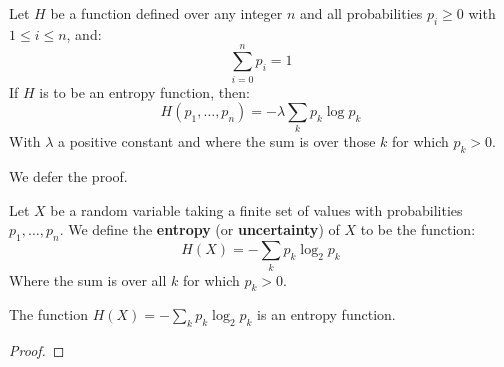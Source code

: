 \begin{theorem}
    Let $H$ be a function defined over any integer  $n$ and all probabilities $p_i \geq 0$ with  $1 \leq i \leq n$, and:
        \begin{equation}
            \sum_{i=0}^{n} p_i=1
        \end{equation}
    If $H$ is to be an entropy function, then:
        \begin{equation}
            H(p_1, \dots, p_n)=-\lambda\sum_{k} p_k \log{p_k}		
        \end{equation} 
    With $\lambda$ a positive constant and where the sum is over those  $k$ for which $p_k>0$.
\end{theorem}
We defer the proof.

\begin{definition}
    Let $X$ be a random variable taking a finite set of values with probabilities  $p_1, \dots, p_n$. We define the 
    \textbf{entropy} (or \textbf{uncertainty}) of $X$ to be the function:
        \begin{equation}
            H(X)=-\sum_{k} p_k \log_{2}{p_k}
        \end{equation}
    Where the sum is over all $k$ for which  $p_k>0$.
\end{definition}

\begin{theorem}
    The function $H(X)=-\sum_{k} p_k \log_{2}{p_k}$ is an entropy function.

\end{theorem}
\begin{proof}
    		
\end{proof}
